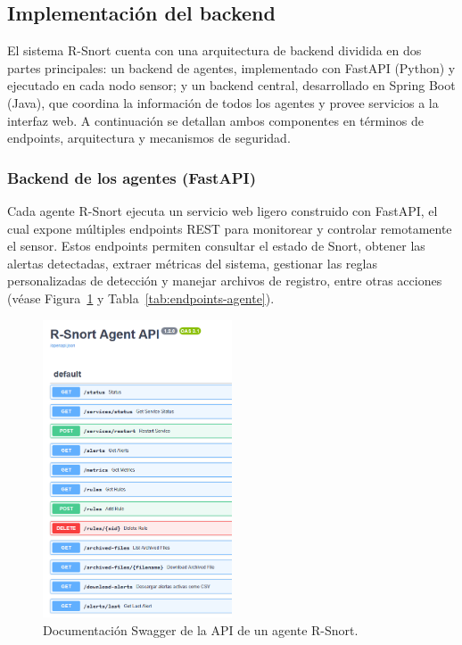 \documentclass[11pt,a4paper,twoside]{report}
\begin{document}
\subsection{Implementación del backend}

El sistema R-Snort cuenta con una arquitectura de backend dividida en dos partes principales: un backend de agentes, implementado con FastAPI (Python) y ejecutado en cada nodo sensor; y un backend central, desarrollado en Spring Boot (Java), que coordina la información de todos los agentes y provee servicios a la interfaz web. A continuación se detallan ambos componentes en términos de endpoints, arquitectura y mecanismos de seguridad.

\subsubsection{Backend de los agentes (FastAPI)}

Cada agente R-Snort ejecuta un servicio web ligero construido con FastAPI, el cual expone múltiples endpoints REST para monitorear y controlar remotamente el sensor. Estos endpoints permiten consultar el estado de Snort, obtener las alertas detectadas, extraer métricas del sistema, gestionar las reglas personalizadas de detección y manejar archivos de registro, entre otras acciones (véase Figura~\ref{fig:fastapi} y Tabla~\ref{tab:endpoints-agente}).

\begin{figure}[htb]
	\centering
	\includegraphics[width=0.5\textwidth]{documento/13.png}
	\caption{Documentación Swagger de la API de un agente R-Snort.}
	\label{fig:fastapi}
\end{figure}
\end{document}
